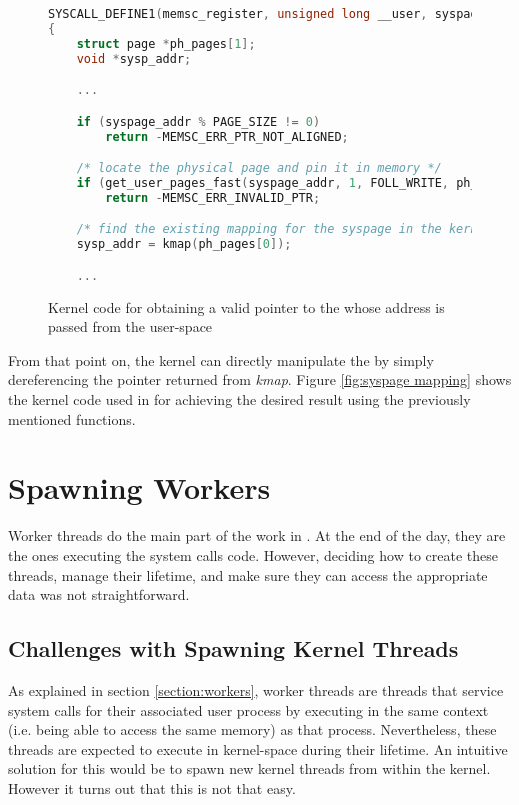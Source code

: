 \begin{figure}[h]
    \begin{lstlisting}[language=C]
SYSCALL_DEFINE1(memsc_register, unsigned long __user, syspage_addr)
{
	struct page *ph_pages[1];
	void *sysp_addr;

	...

	if (syspage_addr % PAGE_SIZE != 0)
		return -MEMSC_ERR_PTR_NOT_ALIGNED;

	/* locate the physical page and pin it in memory */
	if (get_user_pages_fast(syspage_addr, 1, FOLL_WRITE, ph_pages) != 1)
		return -MEMSC_ERR_INVALID_PTR;

	/* find the existing mapping for the syspage in the kernel's address space */
	sysp_addr = kmap(ph_pages[0]);

	...

    \end{lstlisting}
    \caption{Kernel code for obtaining a valid pointer to the \sysp whose
    address is passed from the user-space}
    \label{fig:syspage mapping}
\end{figure}

From that point on, the kernel can directly manipulate the \sysp by simply
dereferencing the pointer returned from \emph{kmap}. Figure \ref{fig:syspage
mapping} shows the kernel code used in \memsc for achieving the desired result
using the previously mentioned functions.

\section{Spawning \memsc Workers}

Worker threads do the main part of the work in \memsc. At the end of the day,
they are the ones executing the system calls code. However, deciding how to
create these threads, manage their lifetime, and make sure they can access the
appropriate data was not straightforward.

\subsection{Challenges with Spawning Kernel Threads}

As explained in section \ref{section:workers}, \memsc worker threads are
threads that service system calls for their associated user process by
executing in the same context (i.e. being able to access the same memory) as
that process. Nevertheless, these threads are expected to execute in
kernel-space during their lifetime. An intuitive solution for this would be to
spawn new kernel threads from within the kernel. However it turns out that this
is not that easy.

